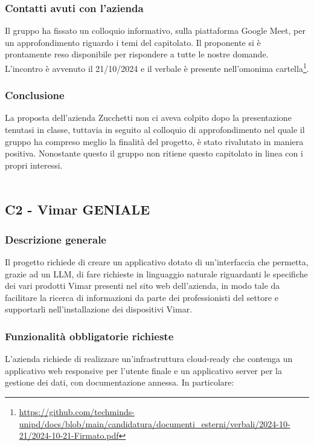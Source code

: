 \documentclass[10pt]{article}
\begin{document}
\subsubsection{Contatti avuti con l'azienda}
Il gruppo ha fissato un colloquio informativo, sulla piattaforma Google Meet, per un approfondimento riguardo i temi del capitolato. Il proponente si è prontamente reso disponibile per rispondere a tutte le nostre domande. L'incontro è avvenuto il 21/10/2024 e il verbale è presente nell'omonima cartella\footnote{\url{https://github.com/techminds-unipd/docs/blob/main/candidatura/documenti_esterni/verbali/2024-10-21/2024-10-21-Firmato.pdf}}.

\subsubsection{Conclusione}
La proposta dell'azienda Zucchetti non ci aveva colpito dopo la presentazione tenutasi in classe, tuttavia in seguito al colloquio di approfondimento nel quale il gruppo ha compreso meglio la finalità del progetto, è stato rivalutato in maniera positiva. Nonostante questo il gruppo non ritiene questo capitolato in linea con i propri interessi.
\\\\
\subsection{C2 - Vimar GENIALE}
\subsubsection{Descrizione generale}
Il progetto richiede di creare un applicativo dotato di un’interfaccia che permetta, grazie ad un LLM, di fare richieste in linguaggio naturale riguardanti le specifiche dei vari prodotti Vimar presenti nel sito web dell’azienda, in modo tale da facilitare la ricerca di informazioni da parte dei professionisti del settore e supportarli nell’installazione dei dispositivi Vimar.

\subsubsection{Funzionalità obbligatorie richieste}
L’azienda richiede di realizzare un’infrastruttura cloud-ready che contenga un applicativo web responsive per l’utente finale e un applicativo server per la gestione dei dati, con documentazione annessa.
In particolare:
\end{document}
